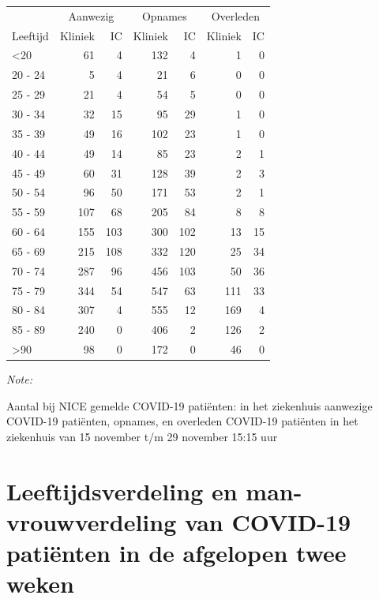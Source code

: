 \documentclass[
  english,
  man,floatsintext]{apa6}
\begin{document}
\begin{table}
\centering\begingroup\fontsize{10}{12}\selectfont

\begin{threeparttable}
\begin{tabular}{lrrrrrr}
\toprule
\multicolumn{1}{c}{ } & \multicolumn{2}{c}{Aanwezig} & \multicolumn{2}{c}{Opnames} & \multicolumn{2}{c}{Overleden} \\
\cmidrule(l{3pt}r{3pt}){2-3} \cmidrule(l{3pt}r{3pt}){4-5} \cmidrule(l{3pt}r{3pt}){6-7}
Leeftijd & Kliniek & IC & Kliniek & IC & Kliniek & IC\\
\midrule
<20 & 61 & 4 & 132 & 4 & 1 & 0\\
20 - 24 & 5 & 4 & 21 & 6 & 0 & 0\\
25 - 29 & 21 & 4 & 54 & 5 & 0 & 0\\
30 - 34 & 32 & 15 & 95 & 29 & 1 & 0\\
35 - 39 & 49 & 16 & 102 & 23 & 1 & 0\\
40 - 44 & 49 & 14 & 85 & 23 & 2 & 1\\
45 - 49 & 60 & 31 & 128 & 39 & 2 & 3\\
50 - 54 & 96 & 50 & 171 & 53 & 2 & 1\\
55 - 59 & 107 & 68 & 205 & 84 & 8 & 8\\
60 - 64 & 155 & 103 & 300 & 102 & 13 & 15\\
65 - 69 & 215 & 108 & 332 & 120 & 25 & 34\\
70 - 74 & 287 & 96 & 456 & 103 & 50 & 36\\
75 - 79 & 344 & 54 & 547 & 63 & 111 & 33\\
80 - 84 & 307 & 4 & 555 & 12 & 169 & 4\\
85 - 89 & 240 & 0 & 406 & 2 & 126 & 2\\
>90 & 98 & 0 & 172 & 0 & 46 & 0\\
\bottomrule
\end{tabular}
\begin{tablenotes}
\item \textit{Note: } 
\item Aantal bij NICE gemelde COVID-19 patiënten: in het ziekenhuis aanwezige COVID-19 patiënten, opnames, en overleden COVID-19 patiënten in het ziekenhuis van 15 november t/m 29 november 15:15 uur
\end{tablenotes}
\end{threeparttable}
\endgroup{}
\end{table}

\newpage

\hypertarget{leeftijdsverdeling-en-man-vrouwverdeling-van-covid-19-patiuxebnten-in-de-afgelopen-twee-weken}{%
\section{Leeftijdsverdeling en man-vrouwverdeling van COVID-19 patiënten in de afgelopen twee weken}\label{leeftijdsverdeling-en-man-vrouwverdeling-van-covid-19-patiuxebnten-in-de-afgelopen-twee-weken}}
\end{document}
